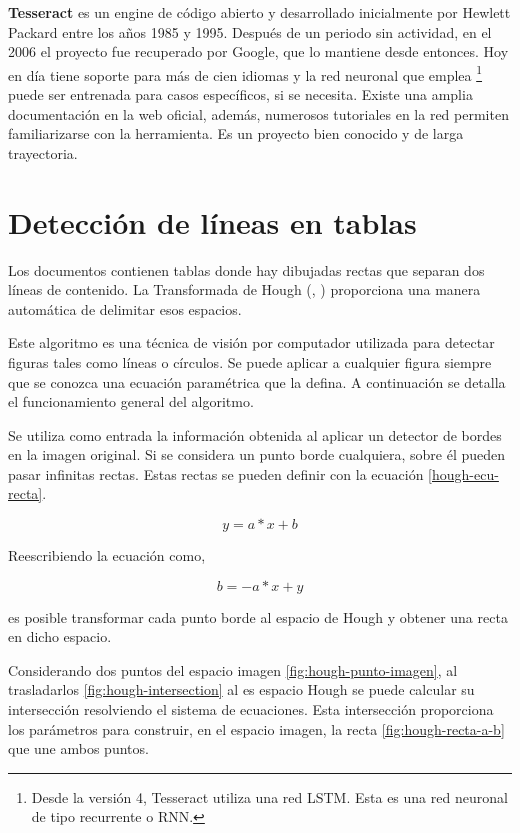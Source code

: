 \textbf{Tesseract} \cite{ocr_tesseract_smith_paper} es un engine de código abierto y desarrollado inicialmente por Hewlett Packard \cite{ocr_tesseract_v4_release_notes} entre los años 1985 y 1995. Después de un periodo sin actividad, en el 2006 el proyecto fue recuperado por Google, que lo mantiene desde entonces. Hoy en día tiene soporte para más de cien idiomas y la red neuronal que emplea \footnote{Desde la versión 4, Tesseract utiliza una red LSTM. Esta es una red neuronal de tipo recurrente o RNN.} puede ser entrenada para casos específicos, si se necesita. Existe una amplia documentación en la web oficial, además, numerosos tutoriales en la red permiten familiarizarse con la herramienta. Es un proyecto bien conocido y de larga trayectoria.

\section{Detección de líneas en tablas}

Los documentos contienen tablas donde hay dibujadas rectas que separan dos líneas de contenido. La Transformada de Hough (\cite{hough_krishna_computerVision}, \cite{hough_grauman_presentation}) proporciona una manera automática de delimitar esos espacios.

Este algoritmo es una técnica de visión por computador utilizada para detectar figuras tales como líneas o círculos. Se puede aplicar a cualquier figura siempre que se conozca una ecuación paramétrica que la defina. A continuación se detalla el funcionamiento general del algoritmo.

Se utiliza como entrada la información obtenida al aplicar un detector de bordes en la imagen original. Si se considera un punto borde cualquiera, sobre él pueden pasar infinitas rectas. Estas rectas se pueden definir con la ecuación \ref{hough-ecu-recta}.

\begin{equation}
    \label{hough-ecu-recta}
    y = a*x + b
\end{equation}

Reescribiendo la ecuación como,

\begin{equation}
b = -a*x + y
\end{equation}

es posible transformar cada punto borde al espacio de Hough y obtener una recta en dicho espacio.

Considerando dos puntos del espacio imagen \ref{fig:hough-punto-imagen}, al trasladarlos \ref{fig:hough-intersection} al es espacio Hough se puede calcular su intersección resolviendo el sistema de ecuaciones. Esta intersección proporciona los parámetros para construir, en el espacio imagen, la recta \ref{fig:hough-recta-a-b} que une ambos puntos.

